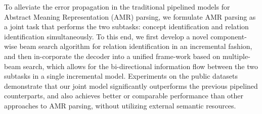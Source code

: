 To alleviate the error propagation in the traditional pipelined models for Abstract Meaning Representation (AMR) parsing, we formulate AMR parsing as a joint task that performs the two subtasks: concept identification and relation identification simultaneously. To this end, we first develop a novel component-wise beam search algorithm for relation identification in an incremental fashion, and then in-corporate the decoder into a unified frame-work based on multiple-beam search, which allows for the bi-directional information flow between the two subtasks in a single incremental model. Experiments on the public datasets demonstrate that our joint model significantly outperforms the previous pipelined counterparts, and also achieves better or comparable performance than other approaches to AMR parsing, without utilizing external semantic resources.

